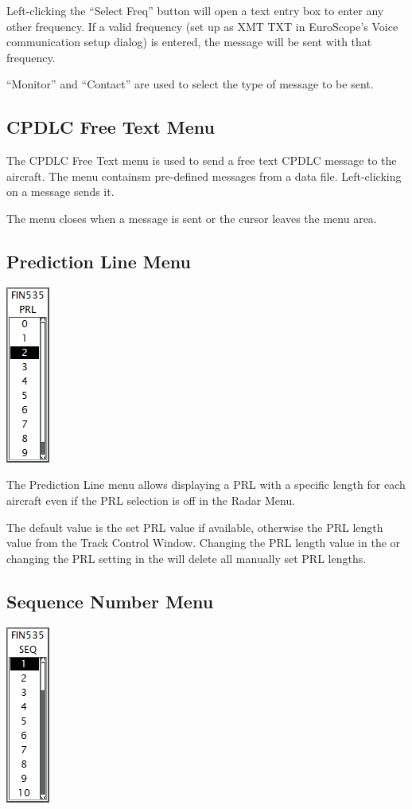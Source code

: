 \documentclass[11pt,a4paper]{memoir}
\begin{document}
Left-clicking the “Select Freq” button will open a text entry box to enter any other frequency. If a valid frequency (set up as XMT TXT in EuroScope’s Voice communication setup dialog) is entered, the message will be sent with that frequency.

“Monitor” and “Contact” are used to select the type of message to be sent.

\subsection{CPDLC Free Text Menu}
\label{menu:dlftm}

The CPDLC Free Text menu is used to send a free text CPDLC message to the aircraft. The menu containsm pre-defined messages from a data file. Left-clicking on a message sends it.

The menu closes when a message is sent or the cursor leaves the menu area.

\subsection{Prediction Line Menu}
\label{menu:prl}
\includegraphics{img/prl.png}

The Prediction Line menu allows displaying a PRL with a specific length for each aircraft even if the PRL selection is off in the Radar Menu.

The default value is the set PRL value if available, otherwise the PRL length value from the Track Control Window. Changing the PRL length value in the \textit{} or changing the PRL setting in the \textit{} will delete all manually set PRL lengths.

\subsection{Sequence Number Menu}
\label{menu:seq}
\includegraphics{img/seq.png}
\end{document}
